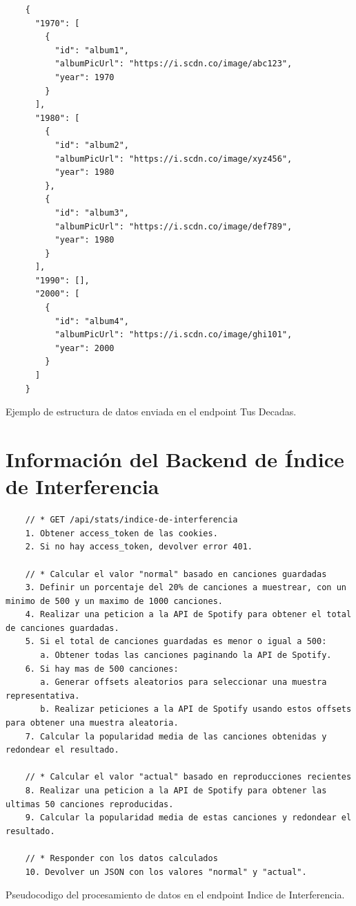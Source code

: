 \begin{ifalgorithm}[H]
    \begin{lstlisting}
    {
      "1970": [
        {
          "id": "album1",
          "albumPicUrl": "https://i.scdn.co/image/abc123",
          "year": 1970
        }
      ],
      "1980": [
        {
          "id": "album2",
          "albumPicUrl": "https://i.scdn.co/image/xyz456",
          "year": 1980
        },
        {
          "id": "album3",
          "albumPicUrl": "https://i.scdn.co/image/def789",
          "year": 1980
        }
      ],
      "1990": [],
      "2000": [
        {
          "id": "album4",
          "albumPicUrl": "https://i.scdn.co/image/ghi101",
          "year": 2000
        }
      ]
    }
    \end{lstlisting}
    \caption{Ejemplo de estructura de datos enviada en el endpoint Tus Decadas.}
    \label{alg:tus_decadas_response}
\end{ifalgorithm}

\section{Información del Backend de Índice de Interferencia} \label{sec:backend_indice_de_interferencia}

\begin{ifalgorithm}[H]
    \begin{lstlisting}
    // * GET /api/stats/indice-de-interferencia
    1. Obtener access_token de las cookies.
    2. Si no hay access_token, devolver error 401.

    // * Calcular el valor "normal" basado en canciones guardadas
    3. Definir un porcentaje del 20% de canciones a muestrear, con un minimo de 500 y un maximo de 1000 canciones.
    4. Realizar una peticion a la API de Spotify para obtener el total de canciones guardadas.
    5. Si el total de canciones guardadas es menor o igual a 500:
       a. Obtener todas las canciones paginando la API de Spotify.
    6. Si hay mas de 500 canciones:
       a. Generar offsets aleatorios para seleccionar una muestra representativa.
       b. Realizar peticiones a la API de Spotify usando estos offsets para obtener una muestra aleatoria.
    7. Calcular la popularidad media de las canciones obtenidas y redondear el resultado.

    // * Calcular el valor "actual" basado en reproducciones recientes
    8. Realizar una peticion a la API de Spotify para obtener las ultimas 50 canciones reproducidas.
    9. Calcular la popularidad media de estas canciones y redondear el resultado.

    // * Responder con los datos calculados
    10. Devolver un JSON con los valores "normal" y "actual".
    \end{lstlisting}
    \caption{Pseudocodigo del procesamiento de datos en el endpoint Indice de Interferencia.}
    \label{alg:indice_interferencia}
\end{ifalgorithm}

